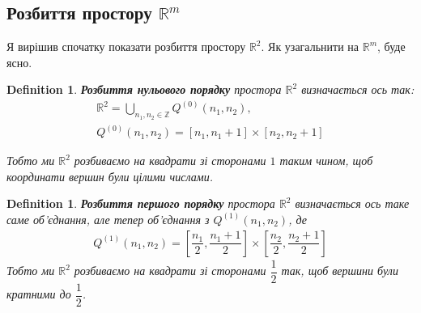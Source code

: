 \documentclass[a4paper, 10pt]{article}
\theoremstyle{theoremdd}
\theoremstyle{theoremdd}
\newtheorem{definition}[theorem]{Definition}
\theoremstyle{theoremdd}
\theoremstyle{theoremdd}
\theoremstyle{theoremdd}
\theoremstyle{theoremdd}
\theoremstyle{theoremdd}
\theoremstyle{theoremdd}
\theoremstyle{theoremdd}
\theoremstyle{theoremdd}
\theoremstyle{theoremdd}
\theoremstyle{theoremdd}
\theoremstyle{theoremdd}
\theoremstyle{theoremdd}
\theoremstyle{theoremdd}
\begin{document}
\subsection{Розбиття простору $\mathbb{R}^m$}
Я вирішив спочатку показати розбиття простору $\mathbb{R}^2$. Як узагальнити на $\mathbb{R}^m$, буде ясно.
\begin{definition}
\textbf{Розбиття нульового порядку} простора $\mathbb{R}^2$ визначається ось так:
\begin{align*}
\mathbb{R}^2 = \bigcup_{n_1,n_2 \in \mathbb{Z}} Q^{(0)}(n_1,n_2), \\
Q^{(0)}(n_1,n_2) = [n_1,n_1+1] \times [n_2,n_2+1]
\end{align*}
\iffalse
Q^{(0)}(n_1,n_2) = \{ (x,y): x \in [n_1,n_1+1], \hspace{0.5cm} y \in [n_2,n_2+1]\} \\
\fi
Тобто ми $\mathbb{R}^2$ розбиваємо на квадрати зі сторонами $1$ таким чином, щоб координати вершин були цілими числами.
\end{definition}

\begin{figure}[H]
\centering
{}
\end{figure}

\begin{definition}
\textbf{Розбиття першого порядку} простора $\mathbb{R}^2$ визначається ось таке саме об'єднання, але тепер об'єднання з $Q^{(1)}(n_1,n_2)$, де
\begin{align*}
Q^{(1)}(n_1,n_2) = \left[ \dfrac{n_1}{2}, \dfrac{n_1+1}{2} \right] \times \left[ \dfrac{n_2}{2}, \dfrac{n_2+1}{2} \right]
\iffalse Q^{(1)} = \left\{ (x,y): x \in \left[\dfrac{n_1}{2},\dfrac{n_1+1}{2} \right], \hspace{0.5cm} y \in \left[\dfrac{n_2}{2},\dfrac{n_2+1}{2} \right] \right\}
\fi
\end{align*}
Тобто ми $\mathbb{R}^2$ розбиваємо на квадрати зі сторонами $\dfrac{1}{2}$ так, щоб вершини були кратними до $\dfrac{1}{2}$.
\end{definition}

\begin{figure}[H]
\centering
{}
\end{figure}
\end{document}
